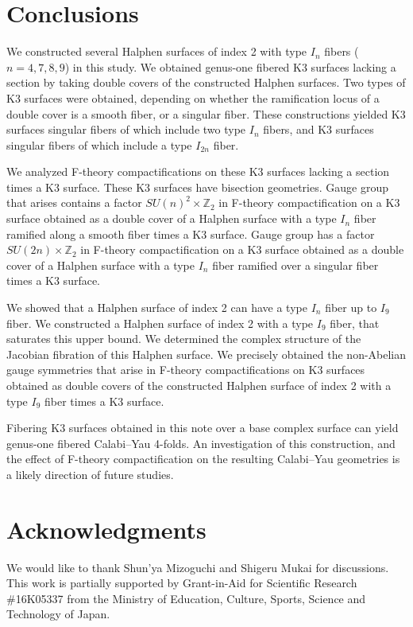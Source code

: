 \documentclass[12pt]{article}
\def\Z{\mathbb{Z}}
\begin{document}
\section{Conclusions}
\label{sec 5}
We constructed several Halphen surfaces of index 2 with type $I_n$ fibers ($n=4,7,8,9$) in this study. We obtained genus-one fibered K3 surfaces lacking a section by taking double covers of the constructed Halphen surfaces. Two types of K3 surfaces were obtained, depending on whether the ramification locus of a double cover is a smooth fiber, or a singular fiber. These constructions yielded K3 surfaces singular fibers of which include two type $I_n$ fibers, and K3 surfaces singular fibers of which include a type $I_{2n}$ fiber. 
\par We analyzed F-theory compactifications on these K3 surfaces lacking a section times a K3 surface. These K3 surfaces have bisection geometries. Gauge group that arises contains a factor $SU(n)^2 \times \Z_2$ in F-theory compactification on a K3 surface obtained as a double cover of a Halphen surface with a type $I_n$ fiber ramified along a smooth fiber times a K3 surface. Gauge group has a factor $SU(2n) \times \Z_2$ in F-theory compactification on a K3 surface obtained as a double cover of a Halphen surface with a type $I_n$ fiber ramified over a singular fiber times a K3 surface. 
\par We showed that a Halphen surface of index 2 can have a type $I_n$ fiber up to $I_9$ fiber. We constructed a Halphen surface of index 2 with a type $I_9$ fiber, that saturates this upper bound. We determined the complex structure of the Jacobian fibration of this Halphen surface. We precisely obtained the non-Abelian gauge symmetries that arise in F-theory compactifications on K3 surfaces obtained as double covers of the constructed Halphen surface of index 2 with a type $I_9$ fiber times a K3 surface. 
\par Fibering K3 surfaces obtained in this note over a base complex surface can yield genus-one fibered Calabi--Yau 4-folds. An investigation of this construction, and the effect of F-theory compactification on the resulting Calabi--Yau geometries is a likely direction of future studies.

\section*{Acknowledgments}

We would like to thank Shun'ya Mizoguchi and Shigeru Mukai for discussions. This work is partially supported by Grant-in-Aid for Scientific Research {\#}16K05337 from the Ministry of Education, Culture, Sports, Science and Technology of Japan.
\end{document}
